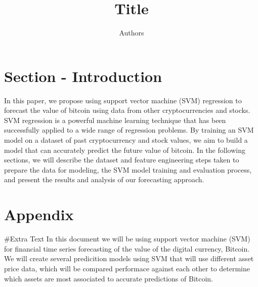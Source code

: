 \documentclass[11pt]{article}
\title{\vspace{-2cm}Title}
\author{Authors}
\date{\vspace{-5ex}}
\theoremstyle{definition}
\begin{document}
\maketitle

\begin{abstract}


\end{abstract}

\section{Section - Introduction}
In this paper, we propose using support vector machine (SVM) regression to forecast the value of bitcoin using data from other cryptocurrencies and stocks. SVM regression is a powerful machine learning technique that has been successfully applied to a wide range of regression problems. By training an SVM model on a dataset of past cryptocurrency and stock values, we aim to build a model that can accurately predict the future value of bitcoin. In the following sections, we will describe the dataset and feature engineering steps taken to prepare the data for modeling, the SVM model training and evaluation process, and present the results and analysis of our forecasting approach.

\newpage
\appendix

\section{Appendix}

#Extra Text
In this document we will be using support vector machine (SVM) for financial time series forecasting of the value of the digital currency, Bitcoin. We will create several predicition models using SVM that will use different asset price data, which will be compared performace against each other to determine which assets are most associated to accurate predictions of Bitcoin.  
\end{document}
